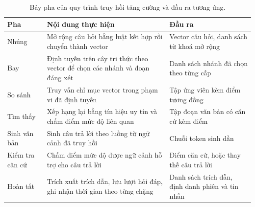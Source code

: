 \begin{table}[htbp]
    \centering
    \caption{Bảy pha của quy trình truy hồi tăng cường và đầu ra tương ứng.}
    \label{tab:bay-pha-rag}
    \small
    \begin{tabularx}{\textwidth}{@{}>{\raggedright\arraybackslash}p{2.5cm}>{\raggedright\arraybackslash}X>{\raggedright\arraybackslash}p{4.8cm}@{}}
        \toprule
        \textbf{Pha} & \textbf{Nội dung thực hiện} & \textbf{Đầu ra} \\
        \midrule
        Nhúng & Mở rộng câu hỏi bằng luật kết hợp rồi chuyển thành vector & Vector câu hỏi, danh sách từ khoá mở rộng \\
        Bay & Định tuyến trên cây tri thức theo vector để chọn các nhánh và đoạn đáng xét & Danh sách nhánh đã chọn theo từng cấp \\
        So sánh & Truy vấn chỉ mục vector trong phạm vi đã định tuyến & Tập ứng viên kèm điểm tương đồng \\
        Tìm thấy & Xếp hạng lại bằng tín hiệu uy tín và chấm điểm mức độ liên quan & Tập đoạn văn bản có căn cứ kèm điểm \\
        Sinh văn bản & Sinh câu trả lời theo luồng từ ngữ cảnh đã truy hồi & Chuỗi token sinh dần \\
        Kiểm tra căn cứ & Chấm điểm mức độ được ngữ cảnh hỗ trợ cho câu trả lời & Điểm căn cứ, hoặc thay thế câu trả lời \\
        Hoàn tất & Trích xuất trích dẫn, lưu lượt hỏi đáp, ghi nhận thời gian theo từng chặng & Danh sách trích dẫn, định danh phiên và tin nhắn \\
        \bottomrule
    \end{tabularx}
\end{table}

